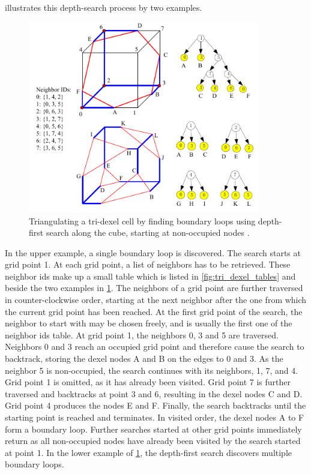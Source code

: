  illustrates this depth-search process by two examples.
%
\begin{figure}
	\centering
	\includegraphics[width=0.9\textwidth]{images/tri_dexel_triangulation}
	\caption[Depth-first search loop discovery]{
		Triangulating a tri-dexel cell by finding boundary loops using depth-first search along the cube, starting at non-occupied nodes \cite{tridexel_reconstruction}.
	}
	\label{fig:tri_dexel_triangulation}
\end{figure}
%
In the upper example, a single boundary loop is discovered.
The search starts at grid point 1.
At each grid point, a list of neighbors has to be retrieved.
These neighbor ids make up a small table which is listed in \cref{fig:tri_dexel_tables} and beside the two examples in \cref{fig:tri_dexel_triangulation}.
The neighbors of a grid point are further traversed in counter-clockwise order, starting at the next neighbor after the one from which the current grid point has been reached.
At the first grid point of the search, the neighbor to start with may be chosen freely, and is usually the first one of the neighbor ids table.
At grid point 1, the neighbors 0, 3 and 5 are traversed.
Neighbors 0 and 3 reach an occupied grid point and therefore cause the search to backtrack, storing the dexel nodes A and B on the edges to 0 and 3.
As the neighbor 5 is non-occupied, the search continues with its neighbors, 1, 7, and 4.
Grid point 1 is omitted, as it has already been visited.
Grid point 7 is further traversed and backtracks at point 3 and 6, resulting in the dexel nodes C and D.
Grid point 4 produces the nodes E and F.
Finally, the search backtracks until the starting point is reached and terminates.
In visited order, the dexel nodes A to F form a boundary loop.
Further searches started at other grid points immediately return as all non-occupied nodes have already been visited by the search started at point 1.
%
In the lower example of \cref{fig:tri_dexel_triangulation}, the depth-first search discovers multiple boundary loops.

